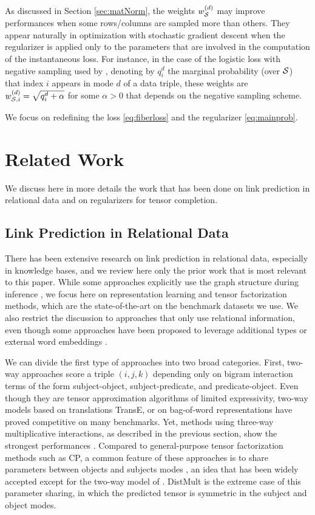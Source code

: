 \documentclass{article}
\newcommand{\CP}{{CP}\xspace}
\newcommand{\distmult}{{DistMult}\xspace}
\newcommand{\transe}{{TransE}\xspace}
\newcommand{\dv}{d}
\newcommand{\indices}{{\cal S}}
\newcommand{\weightv}[1]{w_{\indices}^{(#1)}}
\newcommand{\weightvi}[1]{w_{\indices, i}^{(#1)}}
\begin{document}
As discussed in Section \ref{sec:matNorm}, the weights $\weightv{\dv}$ may improve performances when some rows/columns are sampled more than others. They appear naturally in optimization with stochastic gradient descent when the regularizer is applied only to the parameters that are involved in the computation of the instantaneous loss. For instance, in the case of the logistic loss with negative sampling used by \citet{trouillon_complex_2016}, denoting by $q^{\dv}_{i}$ the marginal probability (over $\indices$) that index $i$ appears in mode $\dv$ of a data triple, these weights are $\weightvi{\dv} = \sqrt{q^{\dv}_{i}+\alpha}$ for some $\alpha>0$ that depends on the negative sampling scheme.

We focus on redefining the loss \eqref{eq:fiberloss} and the regularizer \eqref{eq:mainprob}.

\section{Related Work}
\label{sec:rel_work}
We discuss here in more details the work that has been done on link prediction in relational data and on regularizers for tensor completion.

\subsection{Link Prediction in Relational Data}
There has been extensive research on link prediction in relational data, especially in knowledge bases, and we review here only the prior work that is most relevant to this paper. While some approaches explicitly use the graph structure during inference \citep{lao_random_2011}, we focus here on representation learning and tensor factorization methods, which are the state-of-the-art on the benchmark datasets we use. We also restrict the discussion to approaches that only use relational information, even though some approaches have been proposed to leverage additional types \citep{krompas_s_type-constrained_2015,ma2017transt} or external word embeddings \citep{toutanova_observed_2015}.

We can divide the first type of approaches into two broad categories. First, two-way approaches score a triple $(i,j,k)$ depending only on bigram interaction terms of the form subject-object, subject-predicate, and predicate-object. Even though they are tensor approximation algorithms of limited expressivity, two-way models based on translations \transe, or on bag-of-word representations \citep{joulin2017fast} have proved competitive on many benchmarks. Yet, methods using three-way multiplicative interactions, as described in the previous section, show the strongest performances \citep{bordes_learning_2011,garcia-duran_combining_2015,nickel_holographic_2015,trouillon_complex_2016}. Compared to general-purpose tensor factorization methods such as \CP, a common feature of these approaches is to share parameters between objects and subjects modes \citep{nickel_three-way_2011}, an idea that has been widely accepted except for the two-way model of \citet{joulin2017fast}. \distmult \citep{yang_embedding_2014} is the extreme case of this parameter sharing, in which the predicted tensor is symmetric in the subject and object modes. 
\end{document}
